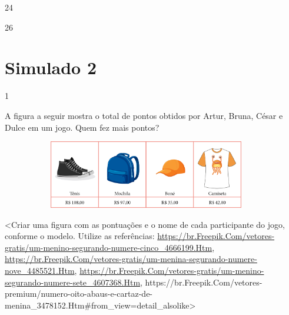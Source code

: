 \begin{escolha}
\begin{escolha}
\begin{minipage}{.5\textwidth}
\begin{escolha}
\item 24

\item 26
\end{escolha}
\end{minipage}



\chapter{Simulado 2}

\num{1}

A figura a seguir mostra o total de pontos obtidos por Artur, Bruna, César
e Dulce em um jogo. Quem fez mais pontos?

\includegraphics[width=5.00000in,height=1.17708in]{media/image125.png}

\textless{}Criar uma figura com as pontuações e o nome de cada
participante do jogo, conforme o modelo. Utilize as referências:
\href{https://br.freepik.com/vetores-gratis/um-menino-segurando-numere-cinco_4666199.htm}{https://br.Freepik.Com/vetores-gratis/um-menino-segurando-numere-cinco\_4666199.Htm},
\href{https://br.freepik.com/vetores-gratis/um-menina-segurando-numere-nove_4485521.htm}{https://br.Freepik.Com/vetores-gratis/um-menina-segurando-numere-nove\_4485521.Htm},
\href{https://br.freepik.com/vetores-gratis/um-menino-segurando-numere-sete_4607368.htm}{https://br.Freepik.Com/vetores-gratis/um-menino-segurando-numere-sete\_4607368.Htm},
https://br.Freepik.Com/vetores-premium/numero-oito-abaus-e-cartaz-de-menina\_3478152.Htm\#from\_view=detail\_alsolike\textgreater{}


\end{escolha}
\end{escolha}
